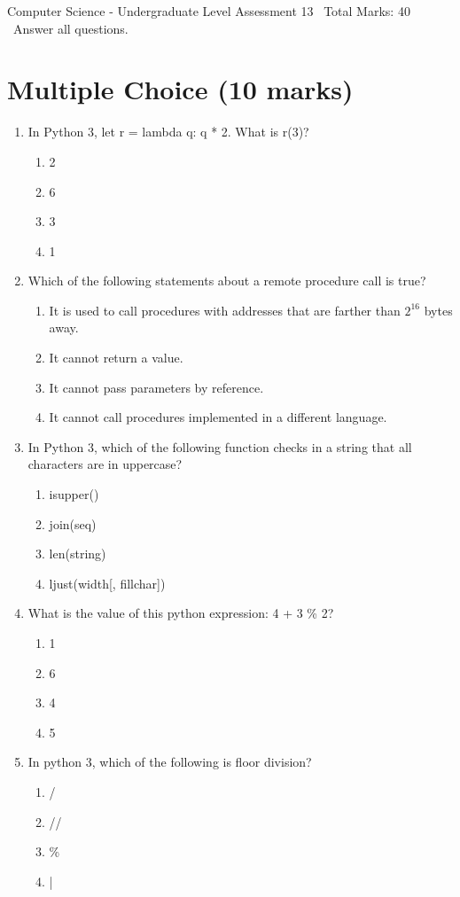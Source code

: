 \documentclass[12pt]{article}
\begin{document}
\begin{center}
Computer Science - Undergraduate Level Assessment 13 \
Total Marks: 40 \
Answer all questions.
\end{center}

\section*{Multiple Choice (10 marks)}
\begin{enumerate}[label=\arabic*.]
\item In Python 3, let r = lambda q: q * 2. What is r(3)?
\begin{enumerate}[label=(\alph*)]
    \item 2
    \item 6
    \item 3
    \item 1
\end{enumerate}
\item Which of the following statements about a remote procedure call is true?
\begin{enumerate}[label=(\alph*)]
    \item It is used to call procedures with addresses that are farther than $2^16$ bytes away.
    \item It cannot return a value.
    \item It cannot pass parameters by reference.
    \item It cannot call procedures implemented in a different language.
\end{enumerate}
\item In Python 3, which of the following function checks in a string that all characters are in uppercase?
\begin{enumerate}[label=(\alph*)]
    \item isupper()
    \item join(seq)
    \item len(string)
    \item ljust(width[, fillchar])
\end{enumerate}
\item What is the value of this python expression: 4 + 3 \% 2?
\begin{enumerate}[label=(\alph*)]
    \item 1
    \item 6
    \item 4
    \item 5
\end{enumerate}
\item In python 3, which of the following is floor division?
\begin{enumerate}[label=(\alph*)]
    \item /
    \item //
    \item \%
    \item |
\end{enumerate}
\end{enumerate}
\end{document}
